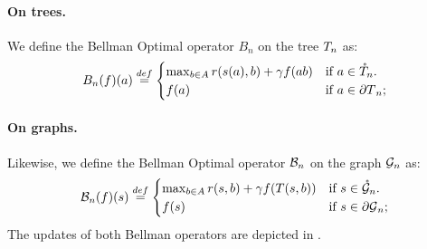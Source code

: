 \documentclass[runningheads]{llncs}
\begin{document}
\begin{definition}
	\label{def:bellman}
	\paragraph{\textbf{On trees.}} We define the Bellman Optimal operator $B_n$ on the tree $T_n$ as:
	\begin{equation}
	\label{eq:bellman-tree}
	B_n(f)(a) \stackrel{def}{=} \begin{cases}
	\max_{b\in A} r(s(a), b) + \gamma f({ab})
	& \text{if $a\in\mathring{T}_n$.} \\
	f(a) & \text{if $a\in{\partial T}_n$;}
	\end{cases}
	\end{equation}
	
	\paragraph{\textbf{On graphs.}} Likewise, we define the Bellman Optimal operator $\mathcal{B}_n$ on the graph $\mathcal{G}_n$ as:
	\begin{equation}
	\label{eq:bellman-graph}
	\mathcal{B}_n(f)(s) \stackrel{def}{=} \begin{cases}
	\max_{b\in A} r(s, b) + \gamma f(T(s,b))
	& \text{if $s\in\mathring{\mathcal{G}}_n$.} \\
	f(s) & \text{if $s\in{\partial \mathcal{G}}_n$;}
	\end{cases}
	\end{equation}
	The updates of both Bellman operators are depicted in .
\end{definition}

\end{document}
